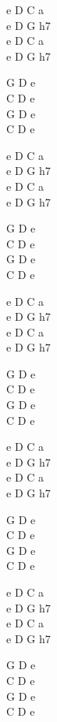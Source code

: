 \begin{chord}
    e D C a\\
    e D G h7\\
    e D C a\\
    e D G h7

    G D e\\
    C D e\\
    G D e\\
    C D e

    e D C a\\
    e D G h7\\
    e D C a\\
    e D G h7

    G D e\\
    C D e\\
    G D e\\
    C D e

    e D C a\\
    e D G h7\\
    e D C a\\
    e D G h7

    G D e\\
    C D e\\
    G D e\\
    C D e

    e D C a\\
    e D G h7\\
    e D C a\\
    e D G h7

    G D e\\
    C D e\\
    G D e\\
    C D e

    e D C a\\
    e D G h7\\
    e D C a\\
    e D G h7

    G D e\\
    C D e\\
    G D e\\
    C D e

\end{chord}